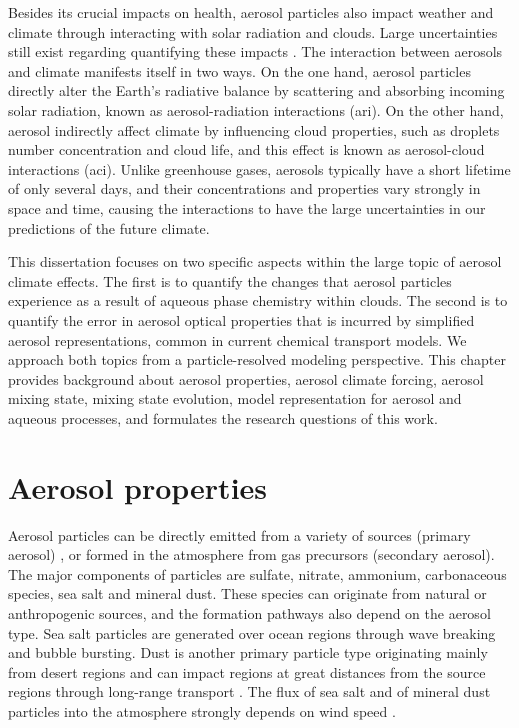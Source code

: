 \documentclass[edeposit,fullpage]{uiucthesis2009}
\begin{document}
Besides its crucial impacts on health, aerosol particles also impact
weather and climate through interacting with solar radiation and
clouds. Large uncertainties still exist regarding quantifying these
impacts \citep{IPCC_CHAPTER7, seinfeld2016improving, fan2016review,
  bellouin2020bounding}. The interaction between aerosols and climate
manifests itself in two ways. On the one hand, aerosol particles
directly alter the Earth's radiative balance by scattering and
absorbing incoming solar radiation, known as aerosol-radiation
interactions (ari). On the other hand, aerosol indirectly affect
climate by influencing cloud properties, such as droplets number
concentration and cloud life, and this effect is known as
aerosol-cloud interactions (aci). Unlike greenhouse gases, aerosols
typically have a short lifetime of only several days, and their
concentrations and properties vary strongly in space and time, causing
the interactions to have the large uncertainties in our predictions of
the future climate.

This dissertation focuses on two specific aspects within the large
topic of aerosol climate effects. The first is to quantify the changes
that aerosol particles experience as a result of aqueous phase
chemistry within clouds. The second is to quantify the error in
aerosol optical properties that is incurred by simplified aerosol
representations, common in current chemical transport models. We
approach both topics from a particle-resolved modeling
perspective. This chapter provides background about aerosol
properties, aerosol climate forcing, aerosol mixing state, mixing
state evolution, model representation for aerosol and aqueous
processes, and formulates the research questions of this work.

\section{Aerosol properties}
\label{cha1-1:aerosol-defi}
Aerosol particles can be directly emitted from a variety of sources
(primary aerosol) , or formed in the atmosphere from gas precursors
(secondary aerosol). The major components of particles are sulfate,
nitrate, ammonium, carbonaceous species, sea salt and mineral
dust. These species can originate from natural or anthropogenic
sources, and the formation pathways also depend on the aerosol
type. Sea salt particles are generated over ocean regions through wave
breaking and bubble bursting. Dust is another primary particle type
originating mainly from desert regions and can impact regions at great
distances from the source regions through long-range transport
\citep{van2018mysterious,yu2021observation}. The flux of sea salt and
of mineral dust particles into the atmosphere strongly depends on wind
speed \citep{monahan1986model, shao2001model, jaegle2011global}.
\end{document}
